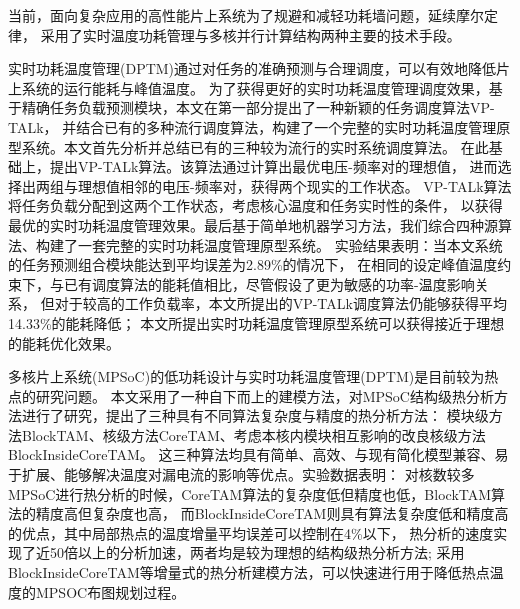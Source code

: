 

{}

\makeatother



\begin{cabstract}

当前，面向复杂应用的高性能片上系统为了规避和减轻功耗墙问题，延续摩尔定律， 采用了实时温度功耗管理与多核并行计算结构两种主要的技术手段。


实时功耗温度管理(DPTM)通过对任务的准确预测与合理调度，可以有效地降低片上系统的运行能耗与峰值温度。 为了获得更好的实时功耗温度管理调度效果，基于精确任务负载预测模块，本文在第一部分提出了一种新颖的任务调度算法VP-TALk， 并结合已有的多种流行调度算法，构建了一个完整的实时功耗温度管理原型系统。本文首先分析并总结已有的三种较为流行的实时系统调度算法。 在此基础上，提出VP-TALk算法。该算法通过计算出最优电压-频率对的理想值， 进而选择出两组与理想值相邻的电压-频率对，获得两个现实的工作状态。 VP-TALk算法将任务负载分配到这两个工作状态，考虑核心温度和任务实时性的条件， 以获得最优的实时功耗温度管理效果。最后基于简单地机器学习方法，我们综合四种源算法、构建了一套完整的实时功耗温度管理原型系统。 实验结果表明：当本文系统的任务预测组合模块能达到平均误差为2.89\%的情况下，
在相同的设定峰值温度约束下，与已有调度算法的能耗值相比，尽管假设了更为敏感的功率-温度影响关系， 但对于较高的工作负载率，本文所提出的VP-TALk调度算法仍能够获得平均14.33\%的能耗降低；
本文所提出实时功耗温度管理原型系统可以获得接近于理想的能耗优化效果。


多核片上系统(MPSoC)的低功耗设计与实时功耗温度管理(DPTM)是目前较为热点的研究问题。 本文采用了一种自下而上的建模方法，对MPSoC结构级热分析方法进行了研究，提出了三种具有不同算法复杂度与精度的热分析方法： 模块级方法BlockTAM、核级方法CoreTAM、考虑本核内模块相互影响的改良核级方法BlockInsideCoreTAM。 这三种算法均具有简单、高效、与现有简化模型兼容、易于扩展、能够解决温度对漏电流的影响等优点。实验数据表明：
对核数较多MPSoC进行热分析的时候，CoreTAM算法的复杂度低但精度也低，BlockTAM算法的精度高但复杂度也高， 而BlockInsideCoreTAM则具有算法复杂度低和精度高的优点，其中局部热点的温度增量平均误差可以控制在4\%以下， 热分析的速度实现了近50倍以上的分析加速，两者均是较为理想的结构级热分析方法;
采用BlockInsideCoreTAM等增量式的热分析建模方法，可以快速进行用于降低热点温度的MPSOC布图规划过程。


\end{cabstract}

